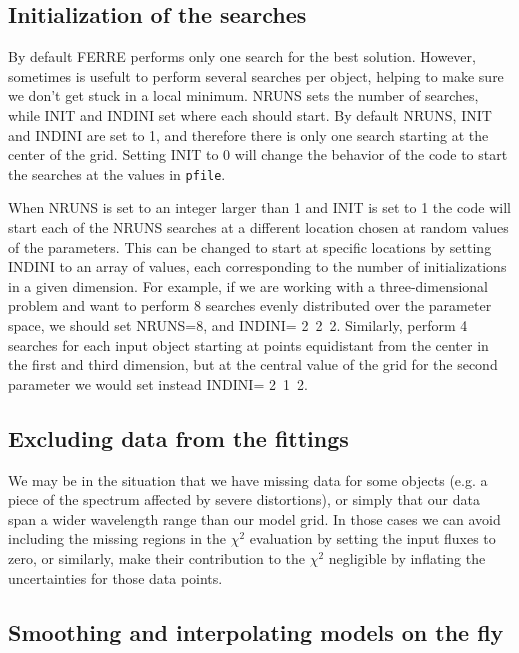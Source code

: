 \documentclass[12pt]{article}
\begin{document}
\subsection{Initialization of the searches}
\label{init}

By default FERRE performs only one search for the best solution.
However, sometimes is usefult to perform several searches per object,
helping to make sure we don't get stuck in a local minimum.
NRUNS sets the number of searches, while INIT and INDINI set where each should
start. By default NRUNS, INIT and INDINI are set to 1, and therefore there is
only one search starting at the center of the grid.
Setting INIT to 0 will change the behavior of the code to start the searches
at the values in {\tt pfile}. 

When NRUNS is set to an integer larger than
1 and INIT is set to 1 the code will start each of the NRUNS searches at a 
different location chosen at random values of the parameters. This can be changed 
to start at specific locations by setting INDINI to an array of values, each
corresponding to the number of initializations in a given dimension. For example,
if we are working with a three-dimensional problem and want to perform 8 searches
evenly distributed over the parameter space, we should set NRUNS=8, and
INDINI= 2~2~2.  Similarly, perform 4 searches for each input object 
starting at points equidistant from the center in the first and third dimension,
but at the central value of the grid for the second parameter we would set instead
INDINI= 2~1~2.

\subsection{Excluding data from the fittings}

We may be in the situation that we have missing data for some objects
(e.g. a piece of the spectrum affected by severe distortions), or
simply that our data span a wider wavelength range than our model grid.
In those cases  we can avoid including the missing regions in the 
$\chi^2$ evaluation by setting the input fluxes to zero, or similarly, 
make their contribution to the $\chi^2$ negligible by inflating the uncertainties
for those data points.

\subsection{Smoothing and interpolating models on the fly}
\label{sinter}
\end{document}
